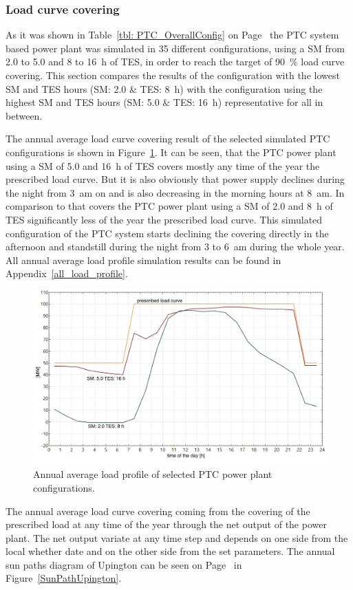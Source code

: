 \subsubsection{Load curve covering}
As it was shown in Table~\ref{tbl: PTC_OverallConfig} on Page~\pageref{tbl: PTC_OverallConfig} the PTC system based power plant was simulated in 35 different configurations, using a SM from 2.0 to 5.0 and 8 to \SI{16}{h} of TES, in order to reach the target of 90~\% load curve covering. This section compares the results of the configuration with the lowest SM and TES hours (SM: 2.0 \& TES: \SI{8}{h}) with the configuration using the highest SM and TES hours  (SM: 5.0 \& TES: \SI{16}{h}) representative for all in between.  

The annual average load curve covering result of the selected simulated PTC configurations is shown in Figure~\ref{PTC_annual_profil}. It can be seen, that the PTC power plant using a SM of 5.0 and \SI{16}{h} of TES covers mostly any time of the year the prescribed load curve. But it is also obviously that power supply declines during the night from \SI{3}{am} on and is also decreasing in the morning hours at \SI{8}{am}. In comparison to that covers the PTC power plant using a SM of 2.0 and \SI{8}{h} of TES significantly less of the year the prescribed load curve. This simulated configuration of the PTC system starts declining the covering directly in the afternoon and standstill during the night from 3 to \SI{6}{am} during the whole year. All annual average load profile simulation results can be found in Appendix~\ref{all_load_profile}.

\begin{figure}[htbp]  
\centering
\includegraphics[width=0.8\linewidth]{FIG/PTC_annual_profil}
\caption[Annual average load profile of selected PTC power plant configurations.]{Annual average load profile of selected PTC power plant configurations.}\label{PTC_annual_profil}
\end{figure}
The annual average load curve covering coming from the covering of the prescribed load at any time of the year through the net output of the power plant. The net output variate at any time step and depends on one side from the local whether date and on the other side from the set parameters. The annual sun paths diagram of Upington can be seen on Page~\pageref{SunPathUpington} in Figure~\ref{SunPathUpington}. 

